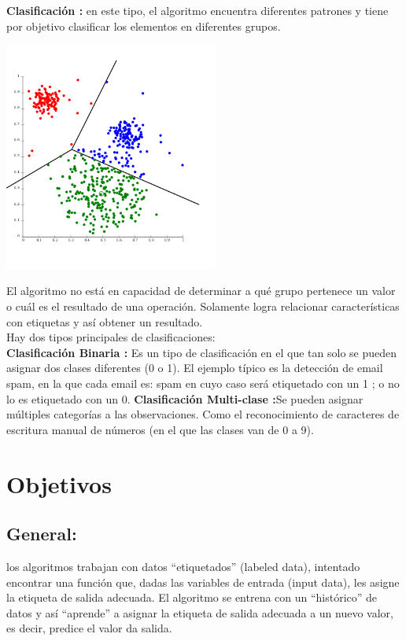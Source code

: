 \documentclass[%
 reprint,
 amsmath,amssymb,
 aps,
]{revtex4-1}
\begin{document}
 \textbf{Clasificación : }en este tipo, el algoritmo encuentra diferentes patrones y tiene por objetivo clasificar los elementos en diferentes grupos.\\
 
 \begin{center}
\includegraphics[width=7cm]{./Imagenes/clasificacion}
\end{center}

El algoritmo no está en capacidad de determinar a qué grupo pertenece un valor o cuál es el resultado de una operación. Solamente logra relacionar características con etiquetas y así obtener un resultado.\\

Hay dos tipos principales de clasificaciones:\\

 \textbf{Clasificación Binaria :} Es un tipo de clasificación en el que tan solo se pueden asignar dos clases diferentes (0 o 1). El ejemplo típico es la detección de email spam, en la que cada email es: spam  en cuyo caso será etiquetado con un 1 ; o no lo es  etiquetado con un 0.
  \textbf{Clasificación Multi-clase :}Se pueden asignar múltiples categorías a las observaciones. Como el reconocimiento de caracteres de escritura manual de números (en el que las clases van de 0 a 9).

 
\section{Objetivos}\label{sec:2}
\subsection{General:}
los algoritmos trabajan con datos “etiquetados” (labeled data), intentado encontrar una función que, dadas las variables de entrada (input data), les asigne la etiqueta de salida adecuada. El algoritmo se entrena con un “histórico” de datos y así “aprende” a asignar la etiqueta de salida adecuada a un nuevo valor, es decir, predice el valor da salida.
\end{document}
